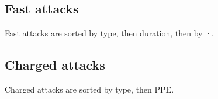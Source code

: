 \subsection{Fast attacks\label{sec:usersfast}}
Fast attacks are sorted by type, then duration, then by \PPT{}·\EPT{}\@.

\subsection{Charged attacks\label{sec:userscharged}}
Charged attacks are sorted by type, then PPE\@.

